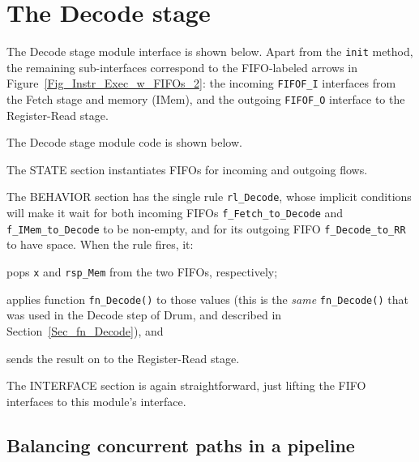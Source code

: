 
\section{The Decode stage}

\label{Sec_Fife_Decode_stage}

The Decode stage module interface is shown below.  Apart from the
\verb|init| method, the remaining sub-interfaces correspond to the
FIFO-labeled arrows in Figure~\ref{Fig_Instr_Exec_w_FIFOs_2}: the
incoming \verb|FIFOF_I| interfaces from the Fetch stage and memory
(IMem), and the outgoing \verb|FIFOF_O| interface to the Register-Read
stage.



The Decode stage module code is shown below.



The STATE section instantiates FIFOs for incoming and outgoing flows.

The BEHAVIOR section has the single rule \verb|rl_Decode|, whose
implicit conditions will make it wait for both incoming FIFOs
\verb|f_Fetch_to_Decode| and \verb|f_IMem_to_Decode| to be non-empty,
and for its outgoing FIFO \verb|f_Decode_to_RR| to have space.  When
the rule fires, it:

\begin{tightlist}
 \item pops \verb|x| and \verb|rsp_Mem| from the two FIFOs, respectively;

 \item applies function \verb|fn_Decode()| to those values (this is
       the \emph{same} \verb|fn_Decode()| that was used in the Decode
       step of Drum, and described in Section~\ref{Sec_fn_Decode}),
       and

 \item sends the result on to the Register-Read stage.
\end{tightlist}

The INTERFACE section is again straightforward, just lifting the FIFO
interfaces to this module's interface.


\subsection{Balancing concurrent paths in a pipeline}

